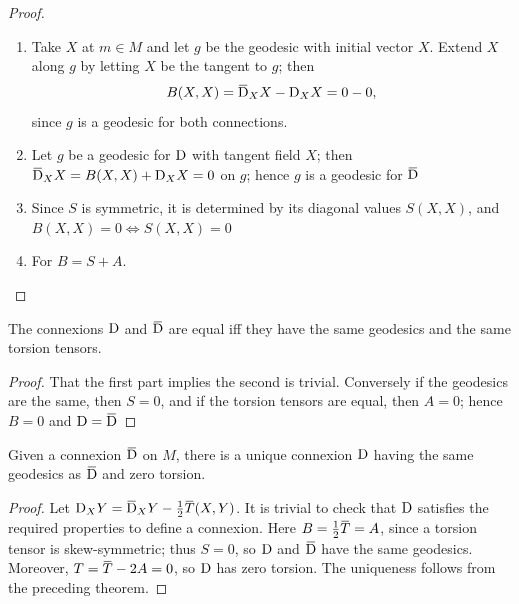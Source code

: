 \documentclass[../main]{subfiles}
\begin{document}
\begin{proof} 
\hfill

\begin{enumerate}
    \item[(a)$\implies$ (b):] Take $X$ at $m\in M$ and let $g$ be the geodesic with initial vector $X$. Extend $X$ along $g$ by letting $X$ be the tangent to $g$; then \[B(X,X)= \covariant_XX-\connection_XX=0-0,\] since $g$ is a geodesic for both connections.
    \item[(b)$\implies$ (a):] Let $g$ be a geodesic for $\mathrm{D}$ with tangent field $X$; then \newline $\covariant_XX = B(X,X)+\connection_XX=0$ on $g$; hence $g$ is a geodesic for $\covariant$
    \item[(b) $\iff$ (c):] Since $S$ is symmetric, it is determined by its diagonal values $S(X,X)$, and $B(X,X)=0\iff S(X,X)=0$
    \item[(c)$\iff$ (d):] For $B=S+A$. \qedhere
\end{enumerate}
\end{proof}



\begin{theorem}\label{thm:ch5.4.2}
The connexions $\mathrm{D}$ and $\covariant$ are equal iff they have the same geodesics and the same torsion tensors.
\end{theorem} 

\begin{proof}

 That the first part implies the second is trivial. Conversely if the geodesics are the same, then $S=0$, and if the torsion tensors are equal, then $A=0$; hence $B=0$ and $\connection=\covariant $
\end{proof}



\begin{theorem}\label{thm:ch5.4.3}
Given a connexion $\covariant$ on $M$, there is a unique connexion $\mathrm{D}$ having the same geodesics as $\covariant$ and zero torsion.
\end{theorem} 

\begin{proof}
 Let $\connection_{X}Y=\covariant_{X} {Y}-\frac{1}{2} \xoverline{T}(X, Y)$. It is trivial to check that $\mathrm{D}$ satisfies the required properties to define a connexion. Here $B=\frac{1}{2} \xoverline{T}=A$, since a torsion tensor is skew-symmetric; thus $S=0$, so $\mathrm{D}$ and $\covariant$ have the same geodesics. Moreover, $T=\xoverline{T}-2 A=0$, so $\mathrm{D}$ has zero torsion. The uniqueness follows from the preceding theorem.
\end{proof}
\end{document}
